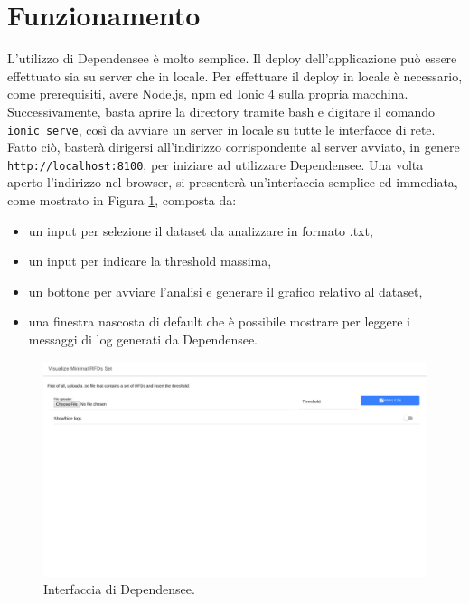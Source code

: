 \section{Funzionamento}
L'utilizzo di Dependensee \`{e} molto semplice. Il deploy dell'applicazione pu\`{o} essere effettuato sia su server che in locale. Per effettuare il deploy in locale \`{e} necessario, come prerequisiti, avere Node.js, npm ed Ionic 4 sulla propria macchina. Successivamente, basta aprire la directory tramite bash e digitare il comando \texttt{ionic serve}, cos\`{i} da avviare un server in locale su tutte le interfacce di rete. Fatto ci\`{o}, baster\`{a} dirigersi all'indirizzo corrispondente al server avviato, in genere \texttt{http://localhost:8100}, per iniziare ad utilizzare Dependensee. Una volta aperto l'indirizzo nel browser, si presenter\`{a} un'interfaccia semplice ed immediata, come mostrato in Figura \ref{fig:dependensee_main_screen}, composta da:
\begin{itemize}
    \item un input per selezione il dataset da analizzare in formato .txt,
    \item un input per indicare la threshold massima,
    \item un bottone per avviare l'analisi e generare il grafico relativo al dataset,
    \item una finestra nascosta di default che \`{e} possibile mostrare per leggere i messaggi di log generati da Dependensee.
\end{itemize}
\begin{figure}[ht]
    \centering
    \includegraphics[width=\linewidth]{capitoli/figure/dependensee_main_screen}
    \caption{Interfaccia di Dependensee.}
    \label{fig:dependensee_main_screen}
\end{figure}
